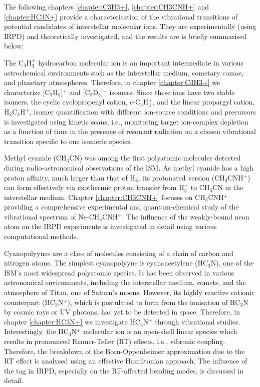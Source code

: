 The following chapters \ref{chapter:C3H3+}, \ref{chapter:CH3CNH+} and \ref{chapter:HC3N+} provide a characterisation of the vibrational transitions of potential candidates of interstellar molecular ions. They are experimentally (using IRPD) and theoretically investigated, and the results are is briefly summarised below:

The C$_3$H$_3^+$ hydrocarbon molecular ion is an important intermediate in various astrochemical environments such as the interstellar medium, cometary comae, and planetary atmospheres. Therefore, in chapter \ref{chapter:C3H3+} we characterize [C$_3$H$_3$]$^+$ and [C$_3$D$_3$]$^+$ isomers. Since these ions have two stable isomers, the cyclic cyclopropenyl cation, c-C$_3$H$_3^+$, and the linear propargyl cation, H$_2$C$_3$H$^+$, isomer quantification with different ion-source conditions and precursors is investigated using kinetic scans, i.e., monitoring target ion-complex depletion as a function of time in the presence of resonant radiation on a chosen vibrational transition specific to one isomeric species.

Methyl cyanide (CH$_3$CN) was among the first polyatomic molecules detected during radio-astronomical observations of the ISM. As methyl cyanide has a high proton affinity, much larger than that of H$_2$, its protonated version (CH$_3$CNH$^+$) can form effectively via exothermic proton transfer from H$_3^+$ to CH$_3$CN in the interstellar medium. Chapter \ref{chapter:CH3CNH+} focuses on CH$_3$CNH$^+$ providing a comprehensive experimental and quantum-chemical study of the vibrational spectrum of Ne-CH$_3$CNH$^+$. The influence of the weakly-bound neon atom on the IRPD experiments is investigated in detail using various computational methods.

Cyanopolyynes are a class of molecules consisting of a chain of carbon and nitrogen atoms. The simplest cyanopolyyne is cyanoacetylene (HC$_3$N), one of the ISM's most widespread polyatomic species. It has been observed in various astronomical environments, including the interstellar medium, comets, and the atmosphere of Titan, one of Saturn's moons. However, its highly reactive cationic counterpart (HC$_3$N$^+$), which is postulated to form from the ionisation of HC$_3$N by cosmic rays or UV photons, has yet to be detected in space. Therefore, in chapter \ref{chapter:HC3N+} we investigate HC$_3$N$^+$ through vibrational studies. Interestingly, the HC$_3$N$^+$ molecular ion is an open-shell linear species which results in pronounced Renner-Teller (RT) effects, i.e., vibronic coupling. Therefore, the breakdown of the Born-Oppenheimer approximation due to the RT effect is analysed using an effective Hamiltonian approach. The influence of the tag in IRPD, especially on the RT-affected bending modes, is discussed in detail.


